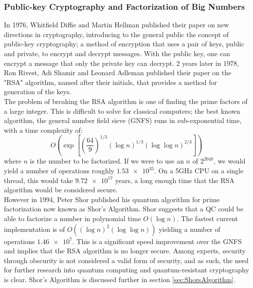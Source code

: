 \documentclass[reqno]{amsart}
\numberwithin{equation}{section}
\numberwithin{figure}{section}
\begin{document}
\subsubsection{Public-key Cryptography and Factorization of Big Numbers} \label{sec:PublickeyCryptography}
\begin{justify}
In 1976, Whitfield Diffie and Martin Hellman published their paper on new directions in cryptography, \cite{DiffieHellman1976} introducing to the general public the concept of public-key cryptography; a method of encryption that uses a pair of keys, public and private, to encrypt and decrypt messages. With the public key, one can encrypt a message that only the private key can decrypt. 2 years later in 1978, Ron Rivest, Adi Shamir and Leonard Adleman published their paper on the "RSA" algorithm, named after their initials, that provides a method for generation of the keys. \cite{RSA1978}\\

The problem of breaking the RSA algorithm is one of finding the prime factors of a large integer. This is difficult to solve for classical computers; the best known algorithm, the general number field sieve (GNFS) \cite{Briggs1998} runs in sub-exponential time, with a time complexity of:
    \begin{equation*}
        O\left(\exp\left[\left(\frac{64}{9}\right)^{1/3}(\log n)^{1/3}(\log \log n)^{2/3}\right]\right) 
    \end{equation*}
    where $n$ is the number to be factorized. If we were to use an $n$ of $2^{2048}$, we would yield a number of operations roughly $\num{1.53e35}$. On a 5GHz CPU on a single thread, this would take $\num{9.72e17}$ years, a long enough time that the RSA algorithm would be considered secure. \\

    However in 1994, Peter Shor published his quantum algorithm for prime factorization \cite{Shor1994} now known as Shor's Algorithm. Shor suggests that a QC could be able to factorize a number in polynomial time $O(\log n)$. The fastest current implementation is of $O((\log n)^{2}(\log \log n))$ \cite{Beckman1996, HarveyHoeeven2021} yielding a number of operations $\num{1.46e7}$. This is a significant speed improvement over the GNFS and implies that the RSA algorithm is no longer secure. Among experts, security through obscurity is not considered a valid form of security, \cite{ScarfoneJansenTracy2008} and as such, the need for further research into quantum computing and quantum-resistant cryptography is clear. Shor's Algorithm is discussed further in section \ref{sec:ShorsAlgorithm}.
\end{justify}
\end{document}
